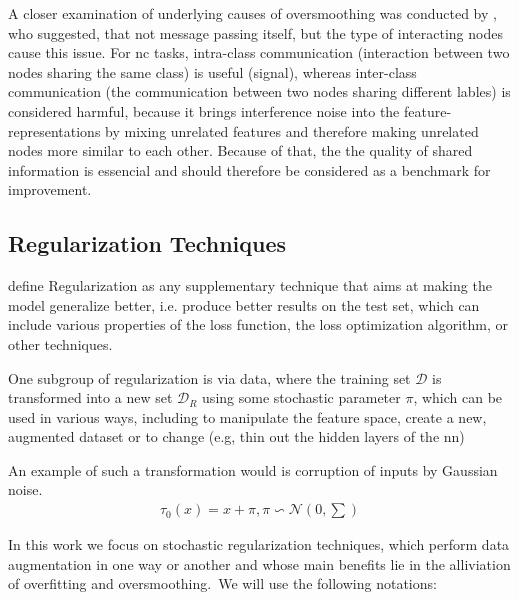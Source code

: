 A closer examination of underlying causes of oversmoothing was conducted by \cite{Chen2020},
who suggested, that not message passing itself, but the type of interacting nodes cause this issue.
For \acf{nc} tasks, intra-class communication (interaction between two nodes sharing the same class)
is useful (signal), whereas inter-class communication (the communication between two nodes sharing
different lables) is considered harmful, because it brings interference noise into the
feature-representations by mixing unrelated features and therefore making unrelated nodes more similar
to each other. Because of that, the the quality of shared information is essencial and should
therefore be considered as a benchmark for improvement.





\subsection{Regularization Techniques}
\label{sec:related:pred:regularization}

\cite{Kukacka2017} define Regularization as any supplementary technique that aims at making the
model generalize better, i.e. produce better results on the test set, which can include various
properties of the loss function, the loss optimization algorithm, or other techniques.

One subgroup of regularization is via data, where the training set $\mathcal{D}$ is
transformed into a new set $\mathcal{D}_{R}$ using some stochastic parameter
$\pi$, which can be used in various ways, including to manipulate the feature space,
create a new, augmented dataset or to change (e.g, thin out the hidden layers of
the \ac{nn})

An example of such a transformation would is corruption of inputs by Gaussian noise.
\begin{align}
    \tau_{0}(x) = x + \pi, \pi \backsim \mathcal{N}(0, \sum)
\end{align}

In this work we focus on stochastic regularization techniques, which perform
data augmentation in one way or another and whose main benefits lie in the alliviation
of overfitting and oversmoothing\cite{Hasanzadeh2020}.\
We will use the following notations: \

